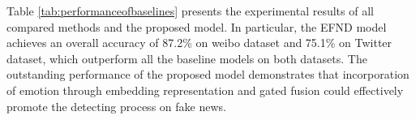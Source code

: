 \documentclass[conference]{IEEEtran}
\newcommand{\m}{EFND}
\begin{document}
	Table \ref{tab:performanceofbaselines} presents the experimental results of all compared methods and the proposed model. In particular, the {\m} model achieves an overall accuracy of 87.2\% on weibo dataset and 75.1\% on Twitter dataset, which outperform all the baseline models on both datasets. The outstanding performance of the proposed model demonstrates that incorporation of emotion through embedding representation and gated fusion could effectively promote the detecting process on fake news.
	
\end{document}
